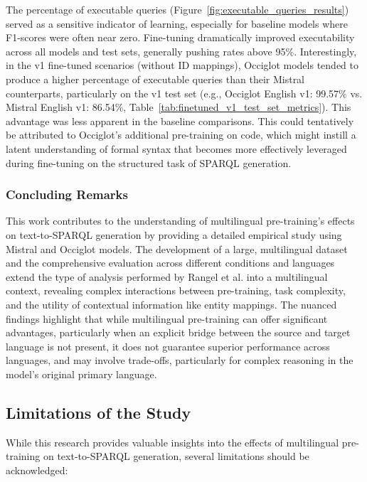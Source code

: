 The percentage of executable queries (Figure~\ref{fig:executable_queries_results}) served as a sensitive indicator of learning, especially for baseline models where F1-scores were often near zero.
Fine-tuning dramatically improved executability across all models and test sets, generally pushing rates above 95\%. 
Interestingly, in the v1 fine-tuned scenarios (without ID mappings), Occiglot models tended to produce a higher percentage of executable queries than their Mistral counterparts, particularly on the v1 test set (e.g., Occiglot English v1: 99.57\% vs. Mistral English v1: 86.54\%, Table~\ref{tab:finetuned_v1_test_set_metrics}). 
This advantage was less apparent in the baseline comparisons. 
This could tentatively be attributed to Occiglot's additional pre-training on code, which might instill a latent understanding of formal syntax that becomes more effectively leveraged during fine-tuning on the structured task of SPARQL generation.

\subsubsection{Concluding Remarks}
This work contributes to the understanding of multilingual pre-training's effects on text-to-SPARQL generation by providing a detailed empirical study using Mistral and Occiglot models. The development of a large, multilingual dataset and the comprehensive evaluation across different conditions and languages extend the type of analysis performed by Rangel et al. \cite{rangel2024sparqlgenerationanalysisfinetuning} into a multilingual context, revealing complex interactions between pre-training, task complexity, and the utility of contextual information like entity mappings. 
The nuanced findings highlight that while multilingual pre-training can offer significant advantages, particularly when an explicit bridge between the source and target language is not present, it does not guarantee superior performance across languages, and may involve trade-offs, particularly for complex reasoning in the model's original primary language.

\subsection{Limitations of the Study}\label{sec:limitations}

While this research provides valuable insights into the effects of multilingual pre-training on text-to-SPARQL generation, several limitations should be acknowledged:


